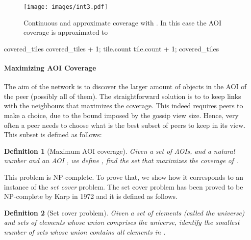 \documentclass[final,10pt,a5paper]{phdimt}
\theoremstyle{definition}
\newtheorem{mydef}{Definition}
\begin{document}
\begin{figure}[tb]
\centering
\texttt{[image: images/int3.pdf]}
\caption{Continuous and approximate coverage with . In this case the AOI coverage is approximated to }\label{fig:app-cont}
\end{figure}

\begin{algorithm}[h]


\BlankLine

{
  {
    {
      {
      covered\_tiles  covered\_tiles + 1;
      }
      tile.count  tile.count + 1;
    }
  }
}
\Return covered\_tiles\;

\caption{Coverage(P, )}\label{alg:approximate-coverage}
\end{algorithm}


\paragraph{Maximizing AOI Coverage}

The aim of the network is to discover the larger amount of objects in the AOI of the peer (possibly all of them). The straightforward solution is to to keep links with the neighbours that maximizes the coverage. This indeed requires peers to make a choice, due to the bound imposed by the gossip view size. Hence, very often a peer needs to choose what is the best subset of peers to keep in its view. This subset is defined as follows:

\begin{mydef}[Maximum AOI coverage]
\emph{
Given a set  of AOIs,  and a natural number  and an AOI , we define , find the set  that maximizes the coverage of .}
\end{mydef}


This problem is NP-complete. To prove that, we show how it corresponds to an instance of the \textit{set cover} problem. 
The set cover problem has been proved to be NP-complete by Karp in 1972 \cite{karp1972reducibility} and it is defined as follows.


\begin{mydef} 
[Set cover problem]  
\emph{Given a set  of elements (called the universe) and  sets of elements whose union comprises the universe, identify the smallest number of sets whose union contains all elements in .}
\end{mydef}
\end{document}

